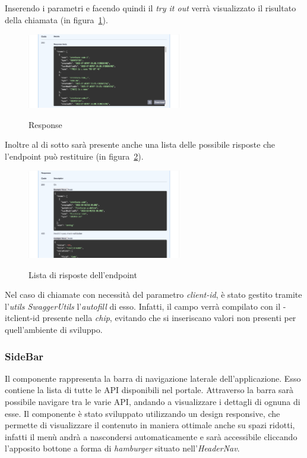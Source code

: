 Inserendo i parametri e facendo quindi il \textit{try it out} verrà visualizzato il risultato della chiamata (in figura~\ref{fig:response}).

\begin{figure}[ht]
  \centering
  \includegraphics[width=0.6\textwidth, alt={Sezione per la visualizzazione della risposta di un endpoint}]{images/frontend/TryItOut3.jpg}
  \caption{Response}\label{fig:response}
\end{figure}

Inoltre al di sotto sarà presente anche una lista delle possibile risposte che l'endpoint può restituire (in figura~\ref{fig:response-list}).

\begin{figure}[ht]
  \centering
  \includegraphics[width=0.6\textwidth, alt={Sezione per la visualizzazione delle possibili risposte di un endpoint}]{images/frontend/TryItOut4.jpg}
  \caption{Lista di risposte dell'endpoint}\label{fig:response-list}
\end{figure}

\pagebreak

Nel caso di chiamate con necessità del parametro \textit{client-id}, è stato gestito tramite l'\textit{utils SwaggerUtils} l'\textit{autofill} di esso.
Infatti, il campo verrà compilato con il \text-it{client-id} presente nella \textit{chip}, evitando che si inseriscano valori non presenti per 
quell'ambiente di sviluppo.

\subsubsection{SideBar}\label{subsubsec:side-bar}
Il componente rappresenta la barra di navigazione laterale dell'applicazione. Esso contiene la lista di tutte le API disponibili nel portale.
Attraverso la barra sarà possibile navigare tra le varie API, andando a visualizzare i dettagli di ognuna di esse. 
Il componente è stato sviluppato utilizzando un design responsive, che permette di visualizzare il contenuto in maniera ottimale anche su spazi ridotti, 
infatti il menù andrà a nascondersi automaticamente e sarà accessibile cliccando l'apposito bottone a forma di \textit{hamburger} situato nell'\textit{HeaderNav}.\\

